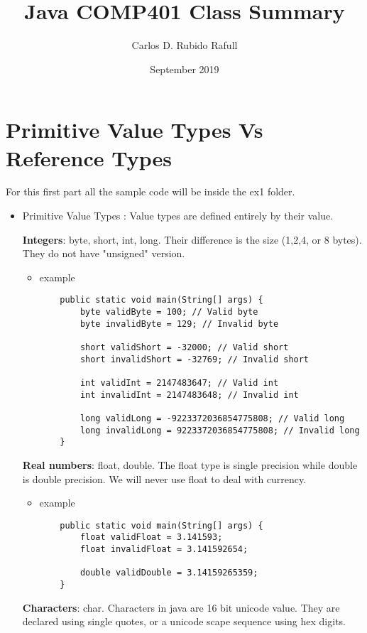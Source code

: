 \documentclass{article}
\title{Java COMP401 Class Summary}
\author{Carlos D. Rubido Rafull }
\date{September 2019}
\begin{document}
\maketitle

\section{Primitive Value Types Vs Reference Types}
For this first part all the sample code will be inside the ex1 folder.
\begin{itemize}
    \item Primitive Value Types : Value types are defined entirely by their value.
    
       \textbf{Integers}: byte, short, int, long. Their difference is the size (1,2,4, or 8 bytes). They do not have "unsigned" version.

    
    \begin{itemize}
    \item example
    \begin{lstlisting}
    public static void main(String[] args) {
        byte validByte = 100; // Valid byte
        byte invalidByte = 129; // Invalid byte
        
        short validShort = -32000; // Valid short 
        short invalidShort = -32769; // Invalid short
        
        int validInt = 2147483647; // Valid int
        int invalidInt = 2147483648; // Invalid int
        
        long validLong = -9223372036854775808; // Valid long
        long invalidLong = 9223372036854775808; // Invalid long
    }
    \end{lstlisting}
    \end{itemize}
    
    \textbf{Real numbers}: float, double. The float type is single precision while double is double precision. We will never use float to deal with currency.
    \begin{itemize}
    \item example
    \begin{lstlisting}
    public static void main(String[] args) {
        float validFloat = 3.141593;
        float invalidFloat = 3.141592654;
        
        double validDouble = 3.14159265359;
    }
    \end{lstlisting}
    \end{itemize}
    
    \textbf{Characters}: char. Characters in java are 16 bit unicode value. They are declared using single quotes, or a unicode scape sequence using hex digits. 
    

\end{itemize}
\end{document}
